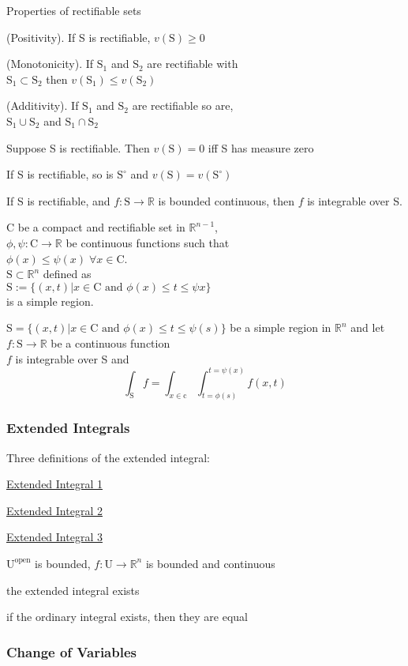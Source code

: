 Properties of rectifiable sets
\begin{myenumerate}
\item (Positivity). If S is rectifiable, $v(\mathrm{S})\geq 0$
\item (Monotonicity). If $\mathrm{S}_1$ and $\mathrm{S}_2$ are rectifiable with\\ 
$\mathrm{S}_1\subset\mathrm{S}_2$ then $v(\mathrm{S}_1)\leq v(\mathrm{S}_2)$
\item (Additivity). If $\mathrm{S}_1$ and $\mathrm{S}_2$ are rectifiable so are,\\
$\mathrm{S}_1\cup\mathrm{S}_2$ and $\mathrm{S}_1\cap\mathrm{S}_2$
\item Suppose S is rectifiable. Then $v(\mathrm{S})=0$ iff S has measure zero
\item If S is rectifiable, so is $\mathrm{S^{\circ}}$ and $v(\mathrm{S})=v(\mathrm{S}^{\circ})$
\item If S is rectifiable, and $f:\mathrm{S}\to\mathbb{R}$ is bounded continuous, 
then $f$ is integrable over S.
\end{myenumerate}


\LET C be a compact and rectifiable set in $\mathbb{R}^{n-1}$,\\
$\phi,\psi:\mathrm{C}\to\mathbb{R}$ be continuous functions such that\\ 
$\phi(x)\leq\psi(x)\;\forall x\in\mathrm{C}$.\\
\THEN $\mathrm{S}\subset\mathbb{R}^n$ defined as \\
$\mathrm{S}:=\{(x,t)|x\in\mathrm{C}\text{ and } \phi(x)\leq t\leq\psi{x}\}$\\
is a simple region.

\LET 
$\mathrm{S}=\{(x,t)| x\in\mathrm{C}\text{ and } \phi(x)\leq t\leq\psi(s)\}$
be a simple region in $\mathbb{R}^n$ and let
$f:\mathrm{S}\to\mathbb{R}$ be a continuous function\\
\THEN $f$ is integrable over S and\\
$$\int_{\mathrm{S}}f = \int_{x\in\mathrm{c}}\int_{t=\phi(s)}^{t=\psi(x)}f(x,t)$$

\subsubsection{Extended Integrals}
Three definitions of the extended integral:
\begin{myenumerate}
\item\hyperref[defn:extended integral]{Extended Integral 1}
\item\hyperref[thm:mnk 15.2]{Extended Integral 2}
\item\hyperref[thm:mnk 16.5]{Extended Integral 3}
\end{myenumerate}

\LET
 $\mathrm{U^{open}}$ is bounded,
$f:\mathrm{U}\to\mathbb{R}^n $ is bounded and continuous\\
\THEN
\begin{myenumerate}
\item the extended integral exists
\item if the ordinary integral exists, then they are equal
\end{myenumerate}

\subsubsection{Change of Variables}
\TODO


